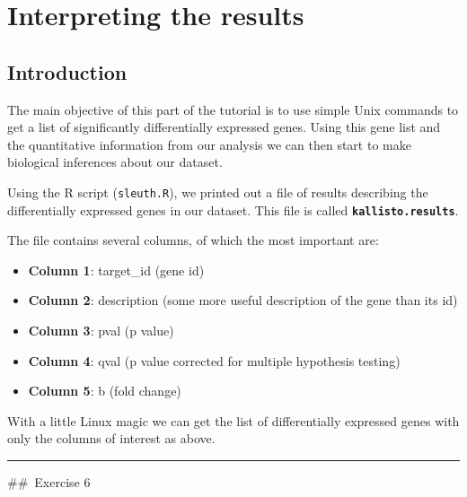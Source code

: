 \documentclass[11pt]{article}
\providecommand{\tightlist}{%
      \setlength{\itemsep}{0pt}\setlength{\parskip}{0pt}}
\begin{document}
\newpage





    \hypertarget{interpreting-the-results}{%
\section{Interpreting the results}\label{interpreting-the-results}}

    \hypertarget{introduction}{%
\subsection{Introduction}\label{introduction}}

The main objective of this part of the tutorial is to use simple Unix
commands to get a list of significantly differentially expressed genes.
Using this gene list and the quantitative information from our analysis
we can then start to make biological inferences about our dataset.

Using the R script (\texttt{sleuth.R}), we printed out a file of results
describing the differentially expressed genes in our dataset. This file
is called \textbf{\texttt{kallisto.results}}.

The file contains several columns, of which the most important are:

\begin{itemize}
\tightlist
\item
  \textbf{Column 1}: target\_id (gene id)\\
\item
  \textbf{Column 2}: description (some more useful description of the
  gene than its id)\\
\item
  \textbf{Column 3}: pval (p value)\\
\item
  \textbf{Column 4}: qval (p value corrected for multiple hypothesis
  testing)\\
\item
  \textbf{Column 5}: b (fold change)
\end{itemize}

With a little Linux magic we can get the list of differentially
expressed genes with only the columns of interest as above.

    \begin{center}\rule{0.5\linewidth}{0.5pt}\end{center}

    \#\#~Exercise 6
\end{document}
